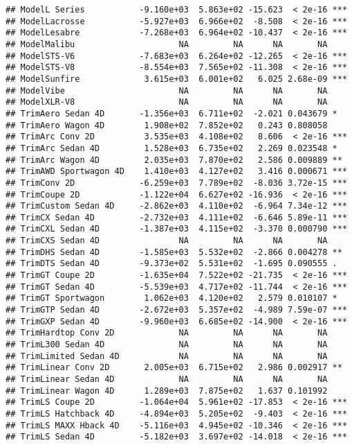 \documentclass[
]{article}
\begin{document}
\begin{verbatim}
## ModelL Series           -9.160e+03  5.863e+02 -15.623  < 2e-16 ***
## ModelLacrosse           -5.927e+03  6.966e+02  -8.508  < 2e-16 ***
## ModelLesabre            -7.268e+03  6.964e+02 -10.437  < 2e-16 ***
## ModelMalibu                     NA         NA      NA       NA    
## ModelSTS-V6             -7.683e+03  6.264e+02 -12.265  < 2e-16 ***
## ModelSTS-V8             -8.554e+03  7.565e+02 -11.308  < 2e-16 ***
## ModelSunfire             3.615e+03  6.001e+02   6.025 2.68e-09 ***
## ModelVibe                       NA         NA      NA       NA    
## ModelXLR-V8                     NA         NA      NA       NA    
## TrimAero Sedan 4D       -1.356e+03  6.711e+02  -2.021 0.043679 *  
## TrimAero Wagon 4D        1.908e+02  7.852e+02   0.243 0.808058    
## TrimArc Conv 2D          3.535e+03  4.108e+02   8.606  < 2e-16 ***
## TrimArc Sedan 4D         1.528e+03  6.735e+02   2.269 0.023548 *  
## TrimArc Wagon 4D         2.035e+03  7.870e+02   2.586 0.009889 ** 
## TrimAWD Sportwagon 4D    1.410e+03  4.127e+02   3.416 0.000671 ***
## TrimConv 2D             -6.259e+03  7.789e+02  -8.036 3.72e-15 ***
## TrimCoupe 2D            -1.122e+04  6.627e+02 -16.936  < 2e-16 ***
## TrimCustom Sedan 4D     -2.862e+03  4.110e+02  -6.964 7.34e-12 ***
## TrimCX Sedan 4D         -2.732e+03  4.111e+02  -6.646 5.89e-11 ***
## TrimCXL Sedan 4D        -1.387e+03  4.115e+02  -3.370 0.000790 ***
## TrimCXS Sedan 4D                NA         NA      NA       NA    
## TrimDHS Sedan 4D        -1.585e+03  5.532e+02  -2.866 0.004278 ** 
## TrimDTS Sedan 4D        -9.373e+02  5.531e+02  -1.695 0.090555 .  
## TrimGT Coupe 2D         -1.635e+04  7.522e+02 -21.735  < 2e-16 ***
## TrimGT Sedan 4D         -5.539e+03  4.717e+02 -11.744  < 2e-16 ***
## TrimGT Sportwagon        1.062e+03  4.120e+02   2.579 0.010107 *  
## TrimGTP Sedan 4D        -2.672e+03  5.357e+02  -4.989 7.59e-07 ***
## TrimGXP Sedan 4D        -9.960e+03  6.685e+02 -14.900  < 2e-16 ***
## TrimHardtop Conv 2D             NA         NA      NA       NA    
## TrimL300 Sedan 4D               NA         NA      NA       NA    
## TrimLimited Sedan 4D            NA         NA      NA       NA    
## TrimLinear Conv 2D       2.005e+03  6.715e+02   2.986 0.002917 ** 
## TrimLinear Sedan 4D             NA         NA      NA       NA    
## TrimLinear Wagon 4D      1.289e+03  7.875e+02   1.637 0.101992    
## TrimLS Coupe 2D         -1.064e+04  5.961e+02 -17.853  < 2e-16 ***
## TrimLS Hatchback 4D     -4.894e+03  5.205e+02  -9.403  < 2e-16 ***
## TrimLS MAXX Hback 4D    -5.116e+03  4.945e+02 -10.346  < 2e-16 ***
## TrimLS Sedan 4D         -5.182e+03  3.697e+02 -14.018  < 2e-16 ***

\end{verbatim}
\end{document}
